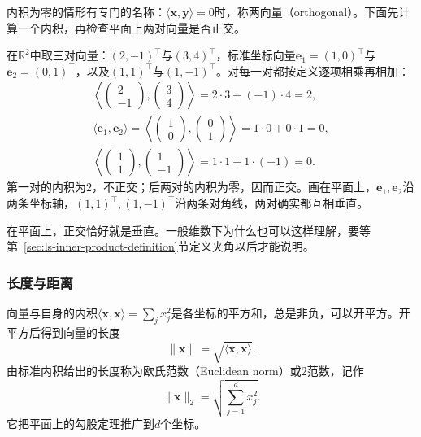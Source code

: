 内积为零的情形有专门的名称：$\langle\bm x,\bm y\rangle=0$时，称两向量（orthogonal）。下面先计算一个内积，再检查平面上两对向量是否正交。
\begin{example}[内积与正交的计算]
\label{ex:ls-inner-product-orthogonality}
在$\mathbb R^2$中取三对向量：$(2,-1)^\top$与$(3,4)^\top$，标准坐标向量$\bm e_1=(1,0)^\top$与$\bm e_2=(0,1)^\top$，以及$(1,1)^\top$与$(1,-1)^\top$。对每一对都按定义逐项相乘再相加：
\[
 \begin{gathered}
 \left\langle\begin{pmatrix}2\\-1\end{pmatrix},\begin{pmatrix}3\\4\end{pmatrix}\right\rangle=2\cdot3+(-1)\cdot4=2,\\
 \langle\bm e_1,\bm e_2\rangle=\left\langle\begin{pmatrix}1\\0\end{pmatrix},\begin{pmatrix}0\\1\end{pmatrix}\right\rangle=1\cdot0+0\cdot1=0,\\
 \left\langle\begin{pmatrix}1\\1\end{pmatrix},\begin{pmatrix}1\\-1\end{pmatrix}\right\rangle=1\cdot1+1\cdot(-1)=0.
 \end{gathered}
\]
第一对的内积为$2$，不正交；后两对的内积为零，因而正交。画在平面上，$\bm e_1,\bm e_2$沿两条坐标轴，$(1,1)^\top,(1,-1)^\top$沿两条对角线，两对确实都互相垂直。
\end{example}
在平面上，正交恰好就是垂直。一般维数下为什么也可以这样理解，要等第~\ref{sec:ls-inner-product-definition}节定义夹角以后才能说明。

\subsubsection{长度与距离}
\label{sec:linear-algebra-length-angle-distance}

向量与自身的内积$\langle\bm x,\bm x\rangle=\sum_jx_j^2$是各坐标的平方和，总是非负，可以开平方。开平方后得到向量的长度
\begin{equation}
 \lVert\bm x\rVert=\sqrt{\langle\bm x,\bm x\rangle}.
 \label{eq:linear-algebra-inner-product-norm}
\end{equation}
由标准内积给出的长度称为欧氏范数（Euclidean norm）或$2$范数，记作
\[
 \lVert\bm x\rVert_2=\sqrt{\sum_{j=1}^d x_j^2}.
\]
它把平面上的勾股定理推广到$d$个坐标。

